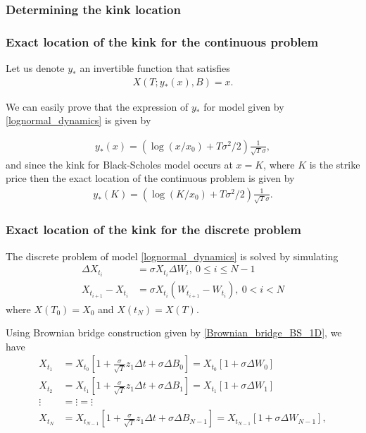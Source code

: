 \documentclass[11pt]{article}
\begin{document}
\subsubsection{Determining the kink location}\label{sec:Determining the kink location}
\subsubsection*{Exact location of the kink for the continuous problem}
Let us denote $y_{\ast}$ an invertible function that satisfies 
\begin{align}\label{eq: kink_point_problem}
	X(T;y_{\ast}(x),B)=x.
\end{align}

We can easily prove that the expression of $y_{\ast}$ for model given by \eqref{lognormal_dynamics} is given by

\begin{align}
	y_{\ast}(x)=\left(\operatorname{log}(x/x_0)+T \sigma^2/2\right) \frac{1}{\sqrt{T} \sigma}, 
\end{align}
and since the kink for Black-Scholes model occurs at $x=K$, where $K
$ is the strike price then  the exact location of the continuous problem is given by 
\begin{align}\label{xact_location_continuous_problem}
	y_{\ast}(K)=\left(\operatorname{log}(K/x_0)+T \sigma^2/2\right) \frac{1}{\sqrt{T} \sigma}.
\end{align}


\subsubsection*{Exact location of the kink for the discrete problem}
The discrete problem of model \eqref{lognormal_dynamics} is solved by simulating 
\begin{align}\label{Discrete_problem}
	\Delta X_{t_i}&=\sigma X_{t_i} \Delta W_{i},\: 0 \le i \le N-1 \nonumber\\
	X_{t_{i+1}}-X_{t_{i}}&=\sigma X_{t_i} \left(W_{t_{i+1}}-W_{t_i}\right),\: 0<i<N
\end{align}
where $X(T_0)=X_0$ and $X(t_N)=X(T)$. 

Using Brownian bridge construction given by \eqref{Brownian_bridge_BS_1D}, we have
\begin{align}
	X_{t_1}&= X_{t_0} \left[ 1+\frac{\sigma}{\sqrt{T}} z_1 \Delta t+ \sigma \Delta B_0\right]=X_{t_0} \left[ 1+\sigma \Delta W_0 \right] \nonumber\\
	X_{t_2}&= X_{t_1} \left[ 1+\frac{\sigma}{\sqrt{T}} z_1 \Delta t+ \sigma \Delta B_1\right]=X_{t_1} \left[ 1+\sigma \Delta W_1 \right] \nonumber\\
	\vdots &= \vdots =\vdots \nonumber\\
	X_{t_N}&= X_{t_{N-1}} \left[ 1+\frac{\sigma}{\sqrt{T}} z_1 \Delta t+ \sigma \Delta B_{N-1}\right]= X_{t_{N-1}}  \left[ 1+\sigma \Delta W_{N-1} \right],
\end{align}
\end{document}

